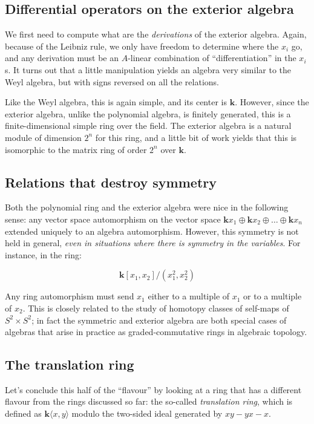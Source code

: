 \documentclass[a4paper]{amsart}
\newcommand{\field}{\mathbf{k}}
\begin{document}
\subsection{Differential operators on the exterior algebra}

We first need to compute what are the {\em derivations} of the
exterior algebra. Again, because of the Leibniz rule, we only have
freedom to determine where the $x_i$ go, and any derivation must be an
$A$-linear combination of ``differentiation'' in the $x_i$s. It turns
out that a little manipulation yields an algebra very similar to the
Weyl algebra, but with signs reversed on all the relations.

Like the Weyl algebra, this is again simple, and its center is
$\field$. However, since the exterior algebra, unlike the polynomial
algebra, is finitely generated, this is a finite-dimensional simple
ring over the field. The exterior algebra is a natural module of
dimension $2^n$ for this ring, and a little bit of work yields that
this is isomorphic to the matrix ring of order $2^n$ over $\field$.

\subsection{Relations that destroy symmetry}

Both the polynomial ring and the exterior algebra were nice in the
following sense: any vector space automorphism on the vector space
$\field x_1 \oplus \field x_2 \oplus \ldots \oplus \field x_n$
extended uniquely to an algebra automorphism. However, this symmetry
is not held in general, {\em even in situations where there is
  symmetry in the variables}. For instance, in the ring:

$$\field[x_1,x_2]/(x_1^2,x_2^2)$$

Any ring automorphism must send $x_1$ either to a multiple of $x_1$ or
to a multiple of $x_2$. This is closely related to the study of
homotopy classes of self-maps of $S^2 \times S^2$; in fact the
symmetric and exterior algebra are both special cases of algebras that
arise in practice as graded-commutative rings in algebraic topology.

\subsection{The translation ring}

Let's conclude this half of the ``flavour'' by looking at a ring that
has a different flavour from the rings discussed so far: the so-called
{\em translation ring}, which is defined as $\field\langle x,y \rangle$ modulo the
two-sided ideal generated by $xy - yx - x$.
\end{document}
